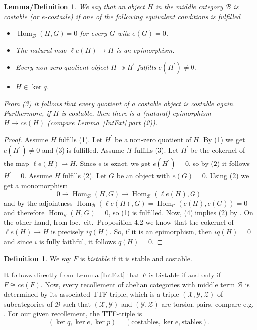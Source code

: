 \documentclass[11pt,a4paper]{amsart}
\theoremstyle{plain}
\newtheorem{lemdef}[thm]{Lemma/Definition}
\theoremstyle{definition}
\newtheorem{dfn}[thm]{Definition}
\begin{document}
\begin{lemdef} \label{costable}
We say that an object $H$ in the middle category ${\mathcal{B}}$ is \emph{costable} (or \emph{${e} $-costable}) if one of the following equivalent conditions is fulfilled 
\begin{itemize}
\item[(1)]
$\operatorname{Hom}_{\mathcal{B}} (H,G) =0$ for every $G$ with ${e} (G)=0$.  
\item[(2)] The natural map $\ell {e} (H) \to H$ is an epimorphism. 
\item[(3)] Every non-zero quotient object $H\operatorname{\twoheadrightarrow } H^\prime$ fulfills ${e} (H^\prime) \neq 0$.
\item[(4)] $H\in \operatorname{ker} q$.
\end{itemize} 
From (3) it follows that every quotient of a costable object is costable again. 
Furthermore, if $H$ is costable, then there is a (natural) epimorphism $H\to c{e}  (H)$ (compare Lemma~\ref{IntExt} part (2)). 
\end{lemdef}

\begin{proof}
Assume $H$ fulfills (1). Let $H^\prime$ be a non-zero quotient of $H$. By (1) we get ${e} (H^\prime )\neq 0$ and (3) is fulfilled. 
Assume $H$ fulfills (3). Let $H^\prime$ be the cokernel of the map $\ell {e} (H) \to H$. Since $e$ is exact, we get ${e} (H^\prime )=0$, so by (2) it follows $H^\prime =0$. 
Assume $H$ fulfills (2). Let $G$ be an object with ${e} (G)=0$. Using (2) we get a monomorphism 
\[ 
0\to \operatorname{Hom}_{\mathcal{B}} (H,G) \to \operatorname{Hom}_{\mathcal{B}}(\ell {e} (H), G)
\]
and by the adjointness $\operatorname{Hom}_{\mathcal{B}} (\ell {e} (H), G) =\operatorname{Hom}_{\mathcal{C}} ({e} (H), {e} (G))=0$ and therefore $\operatorname{Hom}_{\mathcal{B}} (H,G)=0$, so (1) is fulfilled. 
Now, (4) implies (2) by \cite[Proposition 4.9]{FP}. On the other hand, from loc.\ cit.\ Proposition 4.2 we know that the cokernel of $\ell{e} (H)\to H$ is precisely $iq (H)$. So, if it is an epimorphism, then $iq (H)=0$ and since $i$ is fully faithful, it follows $q(H)=0$. 
\end{proof}

\begin{dfn}
\label{d:bistable}
We say $F$ is \emph{bistable} if it is stable and costable. 
\end{dfn}

It follows directly from Lemma \ref{IntExt} that $F$ is bistable if and only if $F\cong c{e} (F)$. 
Now, every recollement of abelian categories with middle term ${\mathcal{B}}$ is determined by its associated TTF-triple, which is a triple $({\mathcal{X}} , {\mathcal{Y}} , {\mathcal{Z}})$ of subcategories of ${\mathcal{B}}$  such that $({\mathcal{X}} , {\mathcal{Y}})$ and $({\mathcal{Y}} , {\mathcal{Z}})$ are torsion pairs, compare e.g. \cite{PV}.
For our given recollement, the TTF-triple is 
\[(\ker q , \operatorname{ker} {e} , \operatorname{ker} p)= (\text{costables}, \operatorname{ker} {e} , \text{stables}).\]
\end{document}
